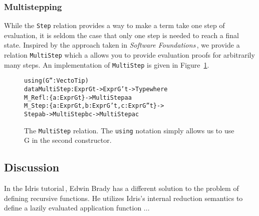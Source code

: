 

\subsubsection{Multistepping}
While the \texttt{Step} relation provides a way to make a term take one step of evaluation, it is seldom the case that only one step is needed to reach a final state. Inspired by the approach taken in \textit{Software Foundations}\,\cite{Pierce:SF}, we provide a relation \texttt{MultiStep} which a allows you to provide evaluation proofs for arbitrarily many steps. An implementation of \texttt{MultiStep} is given in Figure~\ref{fig:MultiStep}.

\begin{figure}
\begin{alltt}
using (G'': Vect o Tip)
  data MultiStep : Expr G t -> Expr G' t -> Type where
     M_Refl : \{a: Expr G t\} -> MultiStep a a
     M_Step : \{a: Expr G t, b: Expr G' t, c: Expr G'' t\} -> 
              Step a b -> MultiStep b c -> MultiStep a c
\end{alltt}
\caption{The \texttt{MultiStep} relation. The \texttt{using} notation simply allows us to use G in the second constructor.}
\label{fig:MultiStep}
\end{figure}

\subsection{Discussion}

In the Idris tutorial\,\cite{Brady:IdrisTutorial}, Edwin Brady has a different solution to the problem of defining recursive functions. He utilizes Idris's internal reduction semantics to define a lazily evaluated application function ...
